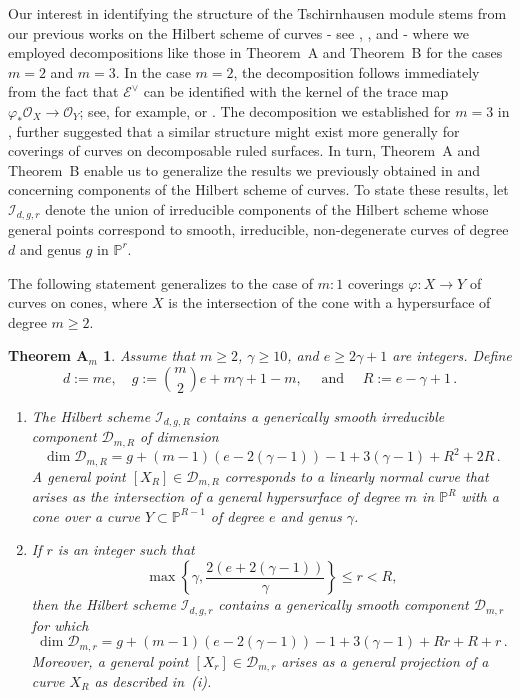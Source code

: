 \documentclass[a4paper,12pt]{amsart}
\newtheorem*{thmAm}{Theorem A$_m$}
\def\dim{\operatorname{dim}}
\begin{document}
Our interest in identifying the structure of the Tschirnhausen module stems from our previous works on the Hilbert scheme of curves - see \cite{CIK21}, \cite{CIK24a}, and \cite{CIK24b} - where we employed decompositions like those in \textnormal{Theorem~A} and \textnormal{Theorem~B} for the cases $m = 2$ and $m = 3$. In the case $m = 2$, the decomposition follows immediately from the fact that  $\mathcal{E}^{\vee}$ can be identified with the kernel of the trace map $\varphi_{\ast} \mathcal{O}_X \to \mathcal{O}_Y$; see, for example, \cite{Mir85} or \cite{CE96}. The decomposition we established for $m = 3$ in \cite{CIK24b}, further suggested that a similar structure might exist more generally for coverings of curves on decomposable ruled surfaces. In turn, \textnormal{Theorem~A}  and \textnormal{Theorem~B} enable us to generalize the results we previously obtained in \cite{CIK21} and \cite{CIK24b} concerning components of the Hilbert scheme of curves. To state these results, let $\mathcal{I}_{d,g,r}$ denote the union of irreducible components of the Hilbert scheme whose general points correspond to smooth, irreducible, non-degenerate curves of degree $d$ and genus $g$ in $\mathbb{P}^r$.


The following statement generalizes \cite[Theorem~A]{CIK21} to the case of $m:1$ coverings $\varphi : X \to Y$ of curves on cones, where $X$ is the intersection of the cone with a hypersurface of degree $m \geq 2$.


\begin{thmAm}
Assume that $m \geq 2$, $\gamma \geq 10$, and $e \geq 2\gamma + 1$ are integers. Define
\[
  d:= me , \quad g := \binom{m}{2}e + m\gamma + 1-m , \quad \mbox{ and } \quad R:= e - \gamma + 1 \, .
\]
\begin{enumerate}[label=(\roman*), leftmargin=*, font=\rmfamily]
 \item The Hilbert scheme $\mathcal{I}_{d, g, R}$ contains a \emph{generically smooth} irreducible component $\mathcal{D}_{m, R}$ of dimension
\[
  \dim \mathcal{D}_{m, R} = g + (m-1)(e - 2(\gamma-1)) - 1 + 3(\gamma-1) + R^2 + 2R \, .
\]
 A general point $[X_R] \in \mathcal{D}_{m, R}$ corresponds to a linearly normal curve that arises as the intersection of a general hypersurface of degree $m$ in $\mathbb{P}^{R}$ with a cone over a curve $Y \subset \mathbb{P}^{R-1}$ of degree $e$ and genus $\gamma$.

 \item If $r$ is an integer such that
\[
 \max \left\lbrace \gamma, \frac{2(e+2(\gamma-1))}{\gamma} \right\rbrace \leq r < R ,
\]
then the Hilbert scheme $\mathcal{I}_{d, g, r}$ contains a \emph{generically smooth} component $\mathcal{D}_{m, r}$ for which
\[
  \dim \mathcal{D}_{m, r} = g + (m-1)(e - 2(\gamma-1)) - 1 + 3(\gamma-1) + R r + R + r \, .
\]
 Moreover, a general point $[X_r] \in \mathcal{D}_{m, r}$ arises as a general projection of a curve $X_R$ as described in~\textnormal{(i)}.
\end{enumerate}
\end{thmAm}
\end{document}
